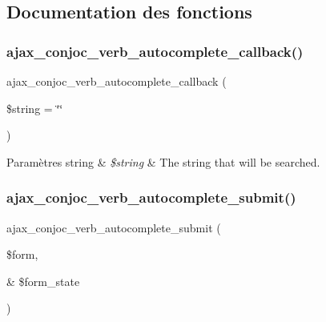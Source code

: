 \subsection{Documentation des fonctions}
\hypertarget{php_2conjoc__webForm_8inc_a5ea54e98ecadf55b7fe917fe6237a52e}{}\label{php_2conjoc__webForm_8inc_a5ea54e98ecadf55b7fe917fe6237a52e} 
\subsubsection{\texorpdfstring{ajax\+\_\+conjoc\+\_\+verb\+\_\+autocomplete\+\_\+callback()}{ajax\_conjoc\_verb\_autocomplete\_callback()}}
{\footnotesize\ttfamily ajax\+\_\+conjoc\+\_\+verb\+\_\+autocomplete\+\_\+callback (\begin{DoxyParamCaption}\item[{}]{\$string = {\ttfamily \char`\"{}\char`\"{}} }\end{DoxyParamCaption})}


\begin{DoxyParams}[1]{Paramètres}
string & {\em \$string} & The string that will be searched. \\
\hline
\end{DoxyParams}
\hypertarget{php_2conjoc__webForm_8inc_add934c4187ded056db9c8369764a51ed}{}\label{php_2conjoc__webForm_8inc_add934c4187ded056db9c8369764a51ed} 
\subsubsection{\texorpdfstring{ajax\+\_\+conjoc\+\_\+verb\+\_\+autocomplete\+\_\+submit()}{ajax\_conjoc\_verb\_autocomplete\_submit()}}
{\footnotesize\ttfamily ajax\+\_\+conjoc\+\_\+verb\+\_\+autocomplete\+\_\+submit (\begin{DoxyParamCaption}\item[{}]{\$form,  }\item[{\&}]{\$form\+\_\+state }\end{DoxyParamCaption})}

